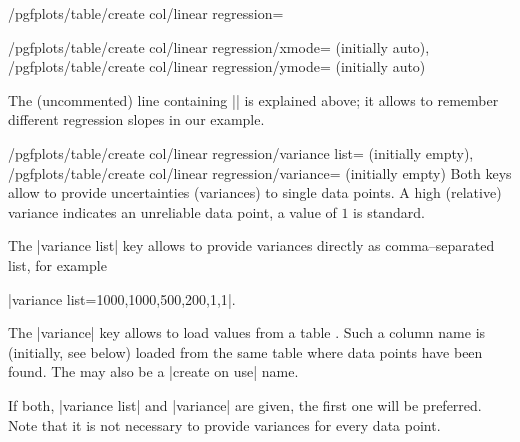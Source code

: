 {\begin{stylekey}{/pgfplots/table/create col/linear regression=}
\begin{keylist}{%
		/pgfplots/table/create col/linear regression/xmode= (initially auto),
		/pgfplots/table/create col/linear regression/ymode= (initially auto)}
\begin{codeexample}[]
\end{codeexample}

	The (uncommented) line containing |\slope| is explained above; it allows to remember different regression slopes in our example.
	\end{keylist}

	\begin{keylist}{%
		/pgfplots/table/create col/linear regression/variance list= (initially empty),%
		/pgfplots/table/create col/linear regression/variance= (initially empty)%
	}
	Both keys allow to provide uncertainties (variances) to single data points. 
	A high (relative) variance indicates an unreliable data point, a value of $1$ is standard.

	The |variance list| key allows to provide variances directly as comma--separated list, for example

	|variance list={1000,1000,500,200,1,1}|.

	The |variance| key allows to load values from a table . Such a column name is (initially, see below) loaded from the same table where data points have been found. The  may also be a |create on use| name.
\begin{codeexample}[]
\end{codeexample}

	If both, |variance list| and |variance| are given, the first one will be preferred. Note that it is not necessary to provide variances for every data point.
	\end{keylist}


\end{stylekey}}
